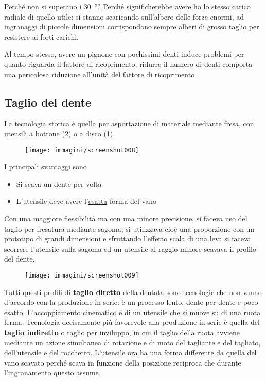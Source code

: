 \documentclass[a4paper, 15pt]{article}
\begin{document}
\begin{adjustwidth}{2in}{}
		Perché non si superano i \SI{30}{\degree}? Perché significherebbe avere ho lo stesso carico radiale di quello utile: si stanno scaricando sull'albero delle forze enormi, ad ingranaggi di piccole dimensioni corrispondono sempre alberi di grosso taglio per resistere ai forti carichi. 
		
		Al tempo stesso, avere un pignone con pochissimi denti induce problemi per quanto riguarda il fattore di ricoprimento, ridurre il numero di denti comporta una pericolosa riduzione all'unità del fattore di ricoprimento.
\end{adjustwidth}
\subsection{Taglio del dente}		
\begin{adjustwidth}{2in}{} 
		La tecnologia storica è quella per asportazione di materiale mediante fresa, con utensili a bottone (2) o a disco (1).
		\begin{figure}[H]
			\centering
			\texttt{[image: immagini/screenshot008]}
			\label{fig:screenshot008}
		\end{figure}		
		 I principali svantaggi sono 
		 \begin{itemize}
		 	\item Si scava un dente per volta
		 	\item L'utensile deve avere l'\underline{esatta} forma del vano
		 \end{itemize}
		Con una maggiore flessibilità ma con una minore precisione, si faceva uso del taglio per fresatura mediante sagoma, si utilizzava cioè una proporzione con un prototipo di grandi dimensioni e sfruttando l'effetto scala di una leva si faceva scorrere l'utensile sulla sagoma ed un utensile al raggio minore scavava il profilo del dente.
		\begin{figure}[H]
			\centering
			\texttt{[image: immagini/screenshot009]}
			\label{fig:screenshot009}
		\end{figure}		
		Tutti questi profili di \textbf{taglio diretto} della dentata sono tecnologie che non vanno d'accordo con la produzione in serie: è un processo lento, dente per dente e poco esatto. L'accoppiamento cinematico è di un utensile che si muove su di una ruota ferma. \newpage
		Tecnologia decisamente più favorevole alla produzione in serie è quella del \textbf{taglio indiretto} o taglio per inviluppo, in cui il taglio della ruota avviene mediante un azione simultanea  di rotazione e di moto del tagliante e del tagliato, dell'utensile e del rocchetto. L'utensile ora ha una forma differente da quella del vano scavato perché scava in funzione della posizione reciproca che durante l'ingranamento questo assume. \newline 
		

\end{adjustwidth}
\end{document}
